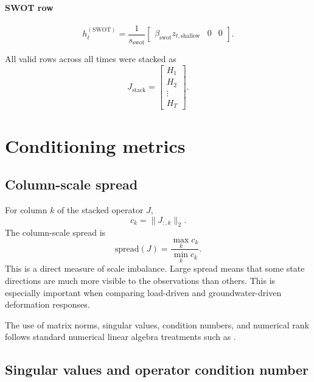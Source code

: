 \documentclass[11pt]{article}
\begin{document}
\paragraph{SWOT row}
\begin{equation}
h_t^{(\mathrm{SWOT})}
=
\frac{1}{s_{\mathrm{swot}}}
\begin{bmatrix}
\beta_{\mathrm{swot}} z_{t,\mathrm{shallow}} & 0 & 0
\end{bmatrix}.
\end{equation}

All valid rows across all times were stacked as
\begin{equation}
J_{\mathrm{stack}}
=
\begin{bmatrix}
H_1\\
H_2\\
\vdots\\
H_T
\end{bmatrix}.
\end{equation}

\section{Conditioning metrics}

\subsection{Column-scale spread}

For column $k$ of the stacked operator $J$,
\begin{equation}
c_k = \|J_{:,k}\|_2.
\end{equation}
The column-scale spread is
\begin{equation}
\mathrm{spread}(J)
=
\frac{\max_k c_k}{\min_k c_k}.
\end{equation}
This is a direct measure of scale imbalance. Large spread means that some state directions are much more visible to the observations than others. This is especially important when comparing load-driven and groundwater-driven deformation responses.

The use of matrix norms, singular values, condition numbers, and numerical rank follows standard numerical linear algebra treatments such as \cite{higham2002accuracy,golub2013matrix}.

\subsection{Singular values and operator condition number}
\end{document}
